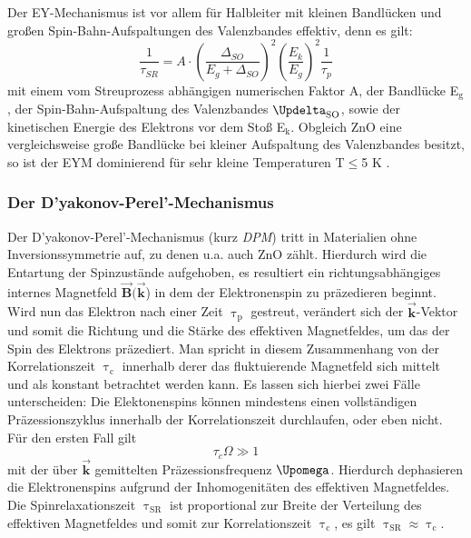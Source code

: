 Der EY-Mechanismus ist vor allem für Halbleiter mit kleinen Bandlücken und großen Spin-Bahn-Aufspaltungen des Valenzbandes effektiv, denn es gilt:
\begin{equation}
\frac{1}{\tau_{SR}}=A \cdot \left(\frac{\Delta_{SO}}{E_g+\Delta_{SO}}\right)^2 \left(\frac{E_k}{E_g}\right)^2  \frac{1}{\tau_p}
\end{equation}
mit einem vom Streuprozess abhängigen numerischen Faktor A, der Bandlücke E$_\text{g}$, der Spin-Bahn-Aufspaltung des Valenzbandes $\Updelta_\text{SO}$, sowie der kinetischen Energie des Elektrons vor dem Stoß E$_\text{k}$. Obgleich ZnO eine vergleichsweise große Bandlücke bei kleiner Aufspaltung des Valenzbandes besitzt, so ist der EYM dominierend für sehr kleine Temperaturen T$\leq$5 K \cite{Buyanova.2010,Whittaker.1996}.
\subsubsection{Der D'yakonov-Perel'-Mechanismus}
Der D'yakonov-Perel'-Mechanismus (kurz \textit{DPM})\cite{Dyakonov.1971} tritt in Materialien ohne Inversionssymmetrie auf, zu denen u.a. auch ZnO zählt. Hierdurch wird die Entartung der Spinzustände aufgehoben, es resultiert ein richtungsabhängiges internes Magnetfeld $\vec{\textbf{B}}(\vec{\textbf{k}}$) in dem der Elektronenspin zu präzedieren beginnt. Wird nun das Elektron nach einer Zeit $\uptau_\text{p}$ gestreut, verändert sich der $\vec{\textbf{k}}$-Vektor und somit die Richtung und die Stärke des effektiven Magnetfeldes, um das der Spin des Elektrons präzediert\cite{Zutic.2004}. Man spricht in diesem Zusammenhang von der Korrelationszeit $\uptau_\text{c}$ innerhalb derer das fluktuierende Magnetfeld sich mittelt und als konstant betrachtet werden kann. Es lassen sich hierbei zwei Fälle unterscheiden: Die Elektonenspins können mindestens einen vollständigen Präzessionszyklus innerhalb der Korrelationszeit durchlaufen, oder eben nicht.
Für den ersten Fall gilt
\begin{equation}
\tau_c \Omega \gg 1
\end{equation}
mit der über $\vec{\textbf{k}}$ gemittelten Präzessionsfrequenz $\Upomega$. Hierdurch dephasieren die Elektronenspins aufgrund der Inhomogenitäten des effektiven Magnetfeldes. Die Spinrelaxationszeit $\uptau_\text{SR}$ ist proportional zur Breite der Verteilung des effektiven Magnetfeldes und somit zur Korrelationszeit $\uptau_\text{c}$, es gilt $\uptau_\text{SR} \approx \uptau_\text{c}$.\\ %
